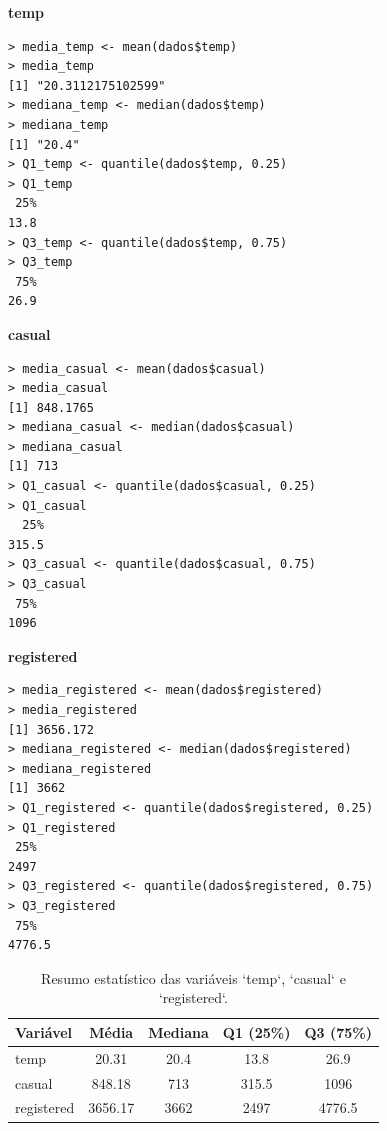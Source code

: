 \documentclass[a4paper,11pt]{article}
\begin{document}
\begin{description}[leftmargin=*]
\item \textbf{temp}
\begin{lstlisting}
> media_temp <- mean(dados$temp)
> media_temp 
[1] "20.3112175102599"
> mediana_temp <- median(dados$temp)
> mediana_temp
[1] "20.4"
> Q1_temp <- quantile(dados$temp, 0.25)
> Q1_temp      
 25% 
13.8
> Q3_temp <- quantile(dados$temp, 0.75)
> Q3_temp      
 75% 
26.9
\end{lstlisting}

\vspace{5mm}

\item \textbf{casual}
\begin{lstlisting}
> media_casual <- mean(dados$casual)
> media_casual
[1] 848.1765
> mediana_casual <- median(dados$casual)
> mediana_casual
[1] 713
> Q1_casual <- quantile(dados$casual, 0.25)
> Q1_casual
  25% 
315.5
> Q3_casual <- quantile(dados$casual, 0.75)
> Q3_casual
 75% 
1096
\end{lstlisting}

\vspace{5mm}

\item \textbf{registered}
\begin{lstlisting}
> media_registered <- mean(dados$registered)
> media_registered  
[1] 3656.172
> mediana_registered <- median(dados$registered)
> mediana_registered 
[1] 3662
> Q1_registered <- quantile(dados$registered, 0.25)
> Q1_registered
 25% 
2497
> Q3_registered <- quantile(dados$registered, 0.75)
> Q3_registered
 75% 
4776.5
\end{lstlisting}

\begin{table}[H]
    \centering
    \label{tab:resumo_estatistico}
    \begin{tabular}{l c c c c}
        \toprule
        \textbf{Variável} & \textbf{Média} & \textbf{Mediana} & \textbf{Q1 (25\%)} & \textbf{Q3 (75\%)} \\
        \midrule
        temp        & 20.31 & 20.4  & 13.8   & 26.9    \\
        casual      & 848.18 & 713   & 315.5  & 1096    \\
        registered  & 3656.17 & 3662 & 2497  & 4776.5  \\
        \bottomrule
    \end{tabular}
    \caption{Resumo estatístico das variáveis `temp`, `casual` e `registered`.}
\end{table}


\end{description}
\end{document}
